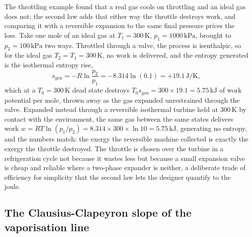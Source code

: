 The throttling example found that a real gas cools on throttling and an ideal gas
does not; the second law adds that either way the throttle destroys work, and
comparing it with a reversible expansion to the same final pressure prices the
loss. Take one mole of an ideal gas at $T_1 = 300\,\si{\kelvin}$, $p_1 =
1000\,\text{kPa}$, brought to $p_2 = 100\,\text{kPa}$ two ways. Throttled through a
valve, the process is isenthalpic, so for the ideal gas $T_2 = T_1 =
300\,\si{\kelvin}$, no work is delivered, and the entropy generated is the
isothermal entropy rise,
\[
s_{\text{gen}} = -R\ln\frac{p_2}{p_1} = -8.314\ln(0.1) =
+19.1\,\text{J}/\si{\kelvin},
\]
which at a $T_0 = 300\,\si{\kelvin}$ dead state destroys $T_0 s_{\text{gen}} =
300 \times 19.1 = 5.75\,\text{kJ}$ of work potential per mole, thrown away as the
gas expanded unrestrained through the valve. Expanded instead through a reversible
isothermal turbine held at $300\,\si{\kelvin}$ by contact with the environment, the
same gas between the same states delivers work $w = RT\ln(p_1/p_2) = 8.314 \times
300 \times \ln 10 = 5.75\,\text{kJ}$, generating no entropy, and the numbers match:
the exergy the reversible machine collected is exactly the exergy the throttle
destroyed. The throttle is chosen over the turbine in a refrigeration cycle not
because it wastes less but because a small expansion valve is cheap and reliable
where a two-phase expander is neither, a deliberate trade of efficiency for
simplicity that the second law lets the designer quantify to the joule.

\subsection{The Clausius-Clapeyron slope of the vaporisation line}

